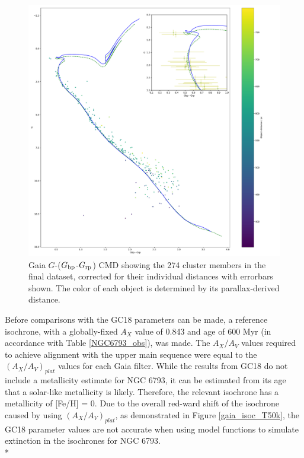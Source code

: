 \documentclass[12pt, a4paper]{report}
\begin{document}
\begin{figure}[htb]
\begin{center}
\includegraphics[scale=0.45]{../NGC_6793_CMD_FeH_0p062_Av_1p1_500Myr_all_isochrones_summary.pdf}
\caption{Gaia $G$-($G_{\textnormal{bp}}$-$G_{\textnormal{rp}}$) CMD showing the 274 cluster members in the final dataset, corrected for their individual distances with errorbars shown. The color of each object is determined by its parallax-derived distance.}
\label{NGC_6793_isoc_inset_1.1_500_0.062}
\end{center}
\end{figure}

Before comparisons with the GC18 parameters can be made, a reference isochrone, with a globally-fixed $A_{X}$ value of 0.843 and age of 600 Myr (in accordance with Table \ref{NGC6793_obs}), was made. The $A_{X}/A_{V}$ values required to achieve alignment with the upper main sequence were equal to the $(A_{X}/A_{V})_{plat}$ values for each Gaia filter. While the results from GC18 do not include a metallicity estimate for NGC 6793, it can be estimated from its age that a solar-like metallicity is likely. Therefore, the relevant isochrone has a metallicity of [Fe/H] = 0. Due to the overall red-ward shift of the isochrone caused by using $(A_{X}/A_{V})_{plat}$, as demonstrated in Figure \ref{gaia_isoc_T50k}, the GC18 parameter values are not accurate when using model functions to simulate extinction in the isochrones for NGC 6793.\\*
\end{document}

